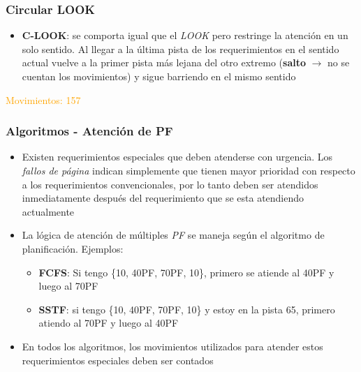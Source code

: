 \begin{frame}
  \frametitle{\textbf{Circular LOOK}}
  \begin{itemize}
    \item \textbf{C-LOOK}: se comporta igual que el \textit{LOOK} pero restringe la atención en un solo sentido. Al llegar a la  última pista de los requerimientos en el sentido actual vuelve a la primer pista más lejana del otro extremo (\textbf{salto} $\rightarrow$ no se cuentan los movimientos) y sigue barriendo en el mismo sentido
  \end{itemize}
  \hspace{35pt} \textcolor{orange}{Movimientos: 157}
\end{frame}

\begin{frame}
  \frametitle{Algoritmos - Atención de \textbf{PF}}
  \begin{itemize}
    \item Existen requerimientos especiales que deben atenderse con urgencia. Los \textit{fallos de página} indican simplemente que tienen mayor prioridad con respecto a los requerimientos convencionales, por lo tanto deben ser atendidos inmediatamente después del requerimiento que se esta atendiendo actualmente    
    \item La lógica de atención de múltiples \textit{PF} se maneja según el algoritmo de planificación. Ejemplos:
    \begin{itemize}
      \item \textbf{FCFS}: Si tengo \{10, 40PF, 70PF, 10\}, primero se atiende al 40PF y luego al 70PF
      \item \textbf{SSTF}: si tengo \{10, 40PF, 70PF, 10\} y estoy en la pista 65, primero atiendo al 70PF y luego al 40PF
    \end{itemize}
    \item En todos los algoritmos, los movimientos utilizados para atender estos requerimientos especiales deben ser contados
  \end{itemize}
\end{frame}


